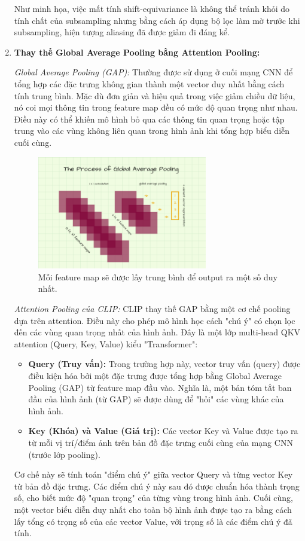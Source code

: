 \begin{enumerate}
Như minh họa, việc mất tính shift-equivariance là không thể tránh khỏi do tính chất của subsampling nhưng bằng cách áp dụng bộ lọc làm mờ trước khi subsampling, hiện tượng aliasing đã được giảm đi đáng kể.
\item \textbf{Thay thế Global Average Pooling bằng Attention Pooling:}

\textit{Global Average Pooling (GAP):} Thường được sử dụng ở cuối mạng CNN để tổng hợp các đặc trưng không gian thành một vector duy nhất bằng cách tính trung bình. Mặc dù đơn giản và hiệu quả trong việc giảm chiều dữ liệu, nó coi mọi thông tin trong feature map đều có mức độ quan trọng như nhau. Điều này có thể khiến mô hình bỏ qua các thông tin quan trọng hoặc tập trung vào các vùng không liên quan trong hình ảnh khi tổng hợp biểu diễn cuối cùng.
    \begin{figure}[H]
    \centering
        \includegraphics[width=0.7\textwidth]{img/03-global_avg.png}
        \caption{Mỗi feature map sẽ được lấy trung bình để output ra một số duy nhất.}
        \label{fig:global_avg}
    \end{figure}
\textit{Attention Pooling của CLIP:} CLIP thay thế GAP bằng một cơ chế pooling dựa trên attention. Điều này cho phép mô hình học cách "chú ý" có chọn lọc đến các vùng quan trọng nhất của hình ảnh. Đây là một lớp multi-head QKV attention (Query, Key, Value) kiểu "Transformer":
\begin{itemize}
    \item \textbf{Query (Truy vấn):} Trong trường hợp này, vector truy vấn (query) được điều kiện hóa bởi một đặc trưng được tổng hợp bằng Global Average Pooling (GAP) từ feature map đầu vào. Nghĩa là, một bản tóm tắt ban đầu của hình ảnh (từ GAP) sẽ được dùng để "hỏi" các vùng khác của hình ảnh.
    \item \textbf{Key (Khóa) và Value (Giá trị):} Các vector Key và Value được tạo ra từ mỗi vị trí/điểm ảnh trên bản đồ đặc trưng cuối cùng của mạng CNN (trước lớp pooling).
\end{itemize}
Cơ chế này sẽ tính toán "điểm chú ý" giữa vector Query và từng vector Key từ bản đồ đặc trưng. Các điểm chú ý này sau đó được chuẩn hóa thành trọng số, cho biết mức độ "quan trọng" của từng vùng trong hình ảnh. Cuối cùng, một vector biểu diễn duy nhất cho toàn bộ hình ảnh được tạo ra bằng cách lấy tổng có trọng số của các vector Value, với trọng số là các điểm chú ý đã tính.


\end{enumerate}
